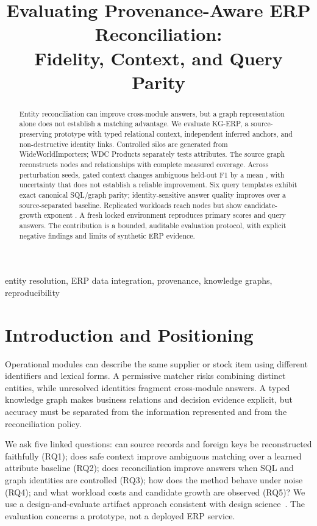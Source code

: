 \documentclass[conference]{IEEEtran}
\title{Evaluating Provenance-Aware ERP Reconciliation:\\Fidelity, Context, and Query Parity}
\author{\IEEEauthorblockN{Anonymous Review Draft}}
\newcommand{\artifact}{KG-ERP}
\begin{document}
\maketitle
\begin{abstract}
Entity reconciliation can improve cross-module answers, but a graph representation alone does not establish a matching advantage. We evaluate \artifact{}, a source-preserving prototype with typed relational context, independent inferred anchors, and non-destructive identity links. Controlled silos are generated from WideWorldImporters; WDC Products separately tests attributes. The source graph reconstructs \GraphNodes{} nodes and \GraphEdges{} relationships with complete measured coverage. Across \SeedCount{} perturbation seeds, gated context changes ambiguous held-out F1 by a mean \MeanDelta{}, with uncertainty that does not establish a reliable improvement. Six query templates exhibit exact canonical SQL/graph parity; identity-sensitive answer quality improves over a source-separated baseline. Replicated workloads reach \MaxScaleNodes{} nodes but show candidate-growth exponent \GrowthExponent{}. A fresh locked environment reproduces primary scores and query answers. The contribution is a bounded, auditable evaluation protocol, with explicit negative findings and limits of synthetic ERP evidence.
\end{abstract}
\begin{IEEEkeywords}
entity resolution, ERP data integration, provenance, knowledge graphs, reproducibility
\end{IEEEkeywords}

\section{Introduction and Positioning}
Operational modules can describe the same supplier or stock item using different identifiers and lexical forms. A permissive matcher risks combining distinct entities, while unresolved identities fragment cross-module answers. A typed knowledge graph makes business relations and decision evidence explicit, but accuracy must be separated from the information represented and from the reconciliation policy.

We ask five linked questions: can source records and foreign keys be reconstructed faithfully (RQ1); does safe context improve ambiguous matching over a learned attribute baseline (RQ2); does reconciliation improve answers when SQL and graph identities are controlled (RQ3); how does the method behave under noise (RQ4); and what workload costs and candidate growth are observed (RQ5)? We use a design-and-evaluate artifact approach consistent with design science~\cite{hevner2004}. The evaluation concerns a prototype, not a deployed ERP service.
\end{document}
